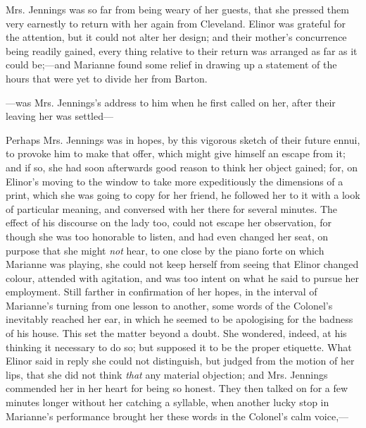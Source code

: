 Mrs. Jennings was so far from being weary of her guests, that she pressed them very earnestly to return with her again from Cleveland. Elinor was grateful for the attention, but it could not alter her design; and their mother's concurrence being readily gained, every thing relative to their return was arranged as far as it could be;---and Marianne found some relief in drawing up a statement of the hours that were yet to divide her from Barton.

---was Mrs. Jennings's address to him when he first called on her, after their leaving her was settled---

Perhaps Mrs. Jennings was in hopes, by this vigorous sketch of their future ennui, to provoke him to make that offer, which might give himself an escape from it; and if so, she had soon afterwards good reason to think her object gained; for, on Elinor's moving to the window to take more expeditiously the dimensions of a print, which she was going to copy for her friend, he followed her to it with a look of particular meaning, and conversed with her there for several minutes. The effect of his discourse on the lady too, could not escape her observation, for though she was too honorable to listen, and had even changed her seat, on purpose that she might {\em not} hear, to one close by the piano forte on which Marianne was playing, she could not keep herself from seeing that Elinor changed colour, attended with agitation, and was too intent on what he said to pursue her employment. Still farther in confirmation of her hopes, in the interval of Marianne's turning from one lesson to another, some words of the Colonel's inevitably reached her ear, in which he seemed to be apologising for the badness of his house. This set the matter beyond a doubt. She wondered, indeed, at his thinking it necessary to do so; but supposed it to be the proper etiquette. What Elinor said in reply she could not distinguish, but judged from the motion of her lips, that she did not think {\em that} any material objection; and Mrs. Jennings commended her in her heart for being so honest. They then talked on for a few minutes longer without her catching a syllable, when another lucky stop in Marianne's performance brought her these words in the Colonel's calm voice,---

